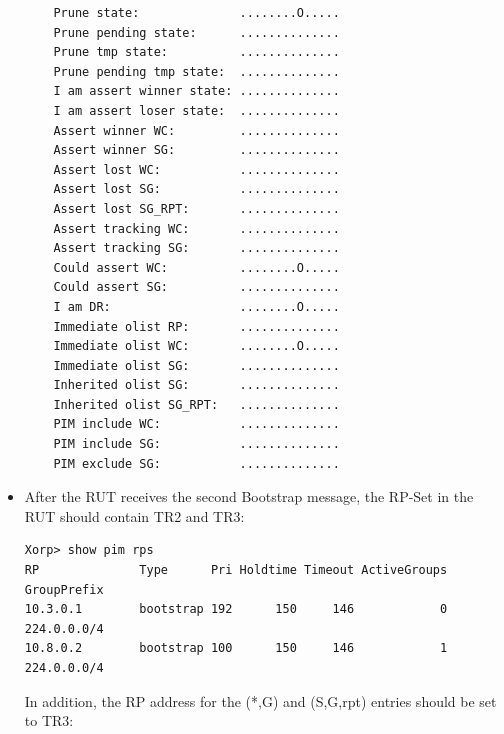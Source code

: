 \documentclass[11pt]{report}
\begin{document}
\begin{itemize}
\begin{verbatim}
    Prune state:              ........O.....
    Prune pending state:      ..............
    Prune tmp state:          ..............
    Prune pending tmp state:  ..............
    I am assert winner state: ..............
    I am assert loser state:  ..............
    Assert winner WC:         ..............
    Assert winner SG:         ..............
    Assert lost WC:           ..............
    Assert lost SG:           ..............
    Assert lost SG_RPT:       ..............
    Assert tracking WC:       ..............
    Assert tracking SG:       ..............
    Could assert WC:          ........O.....
    Could assert SG:          ..............
    I am DR:                  ........O.....
    Immediate olist RP:       ..............
    Immediate olist WC:       ........O.....
    Immediate olist SG:       ..............
    Inherited olist SG:       ..............
    Inherited olist SG_RPT:   ..............
    PIM include WC:           ..............
    PIM include SG:           ..............
    PIM exclude SG:           ..............
\end{verbatim}

  \item After the RUT receives the second Bootstrap message, the RP-Set in the
  RUT should contain TR2 and TR3:

\begin{verbatim}
Xorp> show pim rps 
RP              Type      Pri Holdtime Timeout ActiveGroups GroupPrefix       
10.3.0.1        bootstrap 192      150     146            0 224.0.0.0/4       
10.8.0.2        bootstrap 100      150     146            1 224.0.0.0/4       
\end{verbatim}

  In addition, the RP address for the (*,G) and (S,G,rpt) entries should be
  set to TR3:


\end{itemize}
\end{document}
